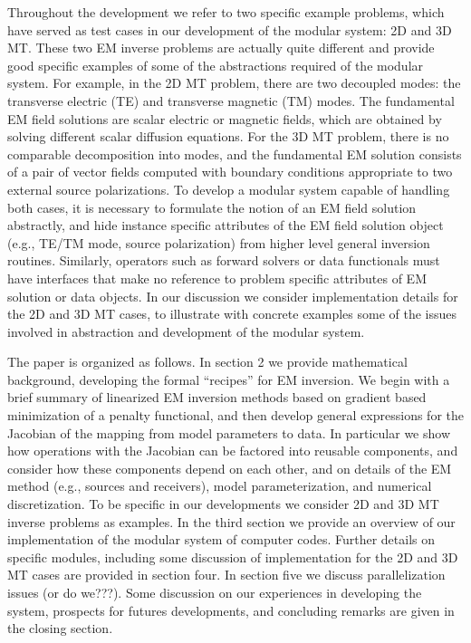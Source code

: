 Throughout the development we refer to two specific example
problems, which have served as test cases in
our development of the modular system: 2D and 3D MT.
These two EM inverse problems are actually quite different and provide
good specific examples of some of the abstractions required of
the modular system.  For example, in the 2D MT problem, there
are two decoupled modes: the transverse electric (TE) and transverse
magnetic (TM) modes. The fundamental EM field solutions
are scalar electric or magnetic fields, which are obtained by
solving different scalar diffusion equations.  
For the 3D MT problem, there is no comparable decomposition into modes,
and the fundamental EM solution consists of a pair of
vector fields computed with boundary conditions appropriate
to two external source polarizations.  To develop a modular
system capable of handling both cases, it is necessary to
formulate the notion of an EM field solution abstractly,
and hide instance specific attributes of the EM field solution
object (e.g., TE/TM mode, source polarization) from higher level
general inversion routines.  Similarly, operators such as forward
solvers or data functionals must have interfaces that make no
reference to problem specific attributes of EM solution or
data objects.  In our discussion we consider implementation
details for the 2D and 3D MT cases, to illustrate with concrete
examples some of the issues involved in abstraction and development
of the modular system.  

The paper is organized as follows.  
In section 2 we provide mathematical background, developing
the formal ``recipes'' for EM inversion.  We begin with 
a brief summary of linearized EM inversion methods
based on gradient based minimization of a penalty functional,
and then develop general expressions
for the Jacobian of the mapping from model parameters to data.
In particular we show how operations with the Jacobian can
be factored into reusable components, and consider how these
components depend on each other, and on details of the EM method
(e.g., sources and receivers), model parameterization, and numerical
discretization.  To be specific in our developments we consider
2D and 3D MT inverse problems as examples.
In the third section we provide an overview of our
implementation of the modular system of computer codes.
Further details on specific modules, including some
discussion of implementation for
the 2D and 3D MT cases are provided in section four.
In section five we discuss parallelization issues (or do we???).  
Some discussion
on our experiences in developing the system, prospects for futures
developments, and concluding remarks are given
in the closing section.

